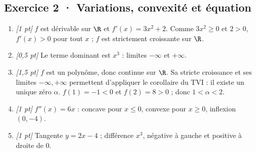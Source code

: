 \subsection*{Exercice 2 · Variations, convexité et équation}\begin{enumerate}

\item \textit{[1 pt]} $f$ est dérivable sur $\R$ et $f'(x)=3x^2+2$. Comme $3x^2\ge0$ et $2>0$, $f'(x)>0$ pour tout $x$ ; $f$ est strictement croissante sur $\R$.

\item \textit{[0,5 pt]} Le terme dominant est $x^3$ : limites $-\infty$ et $+\infty$.

\item \textit{[1,5 pt]} $f$ est un polynôme, donc continue sur $\R$. Sa stricte croissance et ses limites $-\infty,+\infty$ permettent d'appliquer le corollaire du TVI : il existe un unique zéro $\alpha$. $f(1)=-1<0$ et $f(2)=8>0$ ; donc $1<\alpha<2$.

\item \textit{[1 pt]} $f''(x)=6x$ : concave pour $x\le0$, convexe pour $x\ge0$, inflexion $(0,-4)$.

\item \textit{[1 pt]} Tangente $y=2x-4$ ; différence $x^3$, négative à gauche et positive à droite de $0$.

\end{enumerate}

